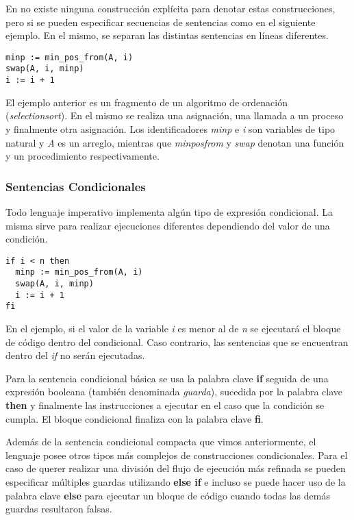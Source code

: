 \documentclass{article}
\begin{document}
En \Lang\space no existe ninguna construcción explícita para denotar estas construcciones, pero si se pueden especificar secuencias de sentencias como en el siguiente ejemplo.
En el mismo, se separan las distintas sentencias en líneas diferentes.

\begin{lstlisting}
minp := min_pos_from(A, i)
swap(A, i, minp)
i := i + 1
\end{lstlisting}

El ejemplo anterior es un fragmento de un algoritmo de ordenación (\textit{selection\gbajo sort}).
En el mismo se realiza una asignación, una llamada a un proceso y finalmente otra asignación.
Los identificadores \textit{minp} e \textit{i} son variables de tipo natural y \textit{A} es un arreglo, mientras que \textit{min\gbajo pos\gbajo from} y \textit{swap} denotan una función y un procedimiento respectivamente.

\subsubsection{Sentencias Condicionales}

Todo lenguaje imperativo implementa algún tipo de expresión condicional.
La misma sirve para realizar ejecuciones diferentes dependiendo del valor de una condición.

\begin{lstlisting}
if i < n then
  minp := min_pos_from(A, i)
  swap(A, i, minp)
  i := i + 1
fi
\end{lstlisting}

En el ejemplo, si el valor de la variable \textit{i} es menor al de \textit{n} se ejecutará el bloque de código dentro del condicional.
Caso contrario, las sentencias que se encuentran dentro del \textit{if} no serán ejecutadas.

Para la sentencia condicional básica se usa la palabra clave \textbf{if} seguida de una expresión booleana (también denominada \textit{guarda}), sucedida por la palabra clave \textbf{then} y finalmente las instrucciones a ejecutar en el caso que la condición se cumpla.
El bloque condicional finaliza con la palabra clave \textbf{fi}.

Además de la sentencia condicional compacta que vimos anteriormente, el lenguaje posee otros tipos más complejos de construcciones condicionales.
Para el caso de querer realizar una división del flujo de ejecución más refinada se pueden especificar múltiples guardas utilizando \textbf{else if} e incluso se puede hacer uso de la palabra clave \textbf{else} para ejecutar un bloque de código cuando todas las demás guardas resultaron falsas.
\end{document}

